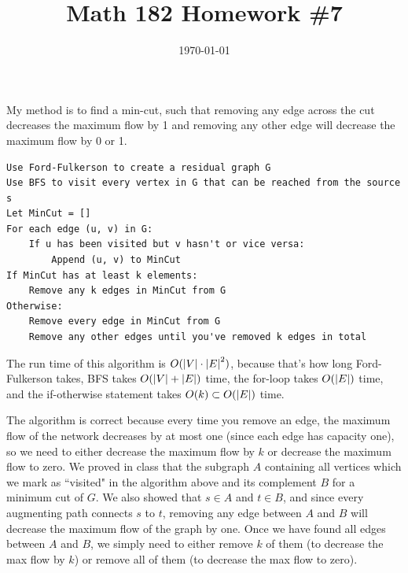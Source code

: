 \documentclass{article}
\date{\today}
\title{Math 182 Homework \#7}
\begin{document}
\maketitle

\begin{prob}
\end{prob}
My method is to find a min-cut, such that removing any edge across the cut decreases the maximum flow by 1 and removing any other edge will decrease the maximum flow by 0 or 1.
\begin{lstlisting}[frame=single]
Use Ford-Fulkerson to create a residual graph G
Use BFS to visit every vertex in G that can be reached from the source s
Let MinCut = []
For each edge (u, v) in G:
    If u has been visited but v hasn't or vice versa:
        Append (u, v) to MinCut
If MinCut has at least k elements:
    Remove any k edges in MinCut from G
Otherwise:
    Remove every edge in MinCut from G
    Remove any other edges until you've removed k edges in total
\end{lstlisting}
The run time of this algorithm is $O(\left\lvert V \right\rvert\cdot \left\lvert E \right\rvert^2)$, because that's how long Ford-Fulkerson takes, BFS takes $O(\left\lvert V \right\rvert+\left\lvert E \right\rvert)$ time, the for-loop takes $O(\left\lvert E \right\rvert)$ time, and the if-otherwise statement takes $O(k)\subset O(\left\lvert E \right\rvert)$ time.
\par
The algorithm is correct because every time you remove an edge, the maximum flow of the network decreases by at most one (since each edge has capacity one), so we need to either decrease the maximum flow by $k$ or decrease the maximum flow to zero. We proved in class that the subgraph $A$ containing all vertices which we mark as ``visited" in the algorithm above and its complement $B$ for a minimum cut of $G$. We also showed that $s \in A$ and $t \in B$, and since every augmenting path connects $s$ to $t$, removing any edge between $A$ and $B$ will decrease the maximum flow of the graph by one. Once we have found all edges between $A$ and $B$, we simply need to either remove $k$ of them (to decrease the max flow by $k$) or remove all of them (to decrease the max flow to zero).
\end{document}
